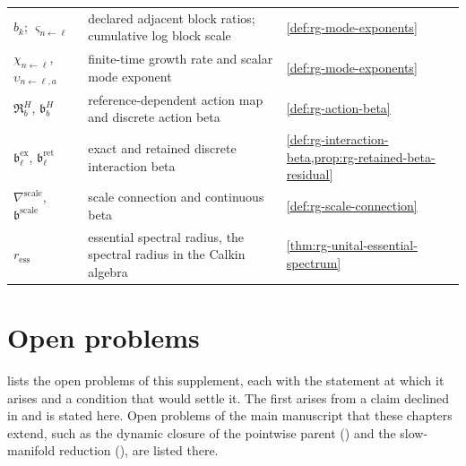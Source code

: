 {\begin{longtable}{@{}>{\raggedright\arraybackslash}p{}
>{\raggedright\arraybackslash}p{}
>{\raggedright\arraybackslash}p{}@{}}
$b_k$; $\varsigma_{n\leftarrow\ell}$ & declared adjacent block ratios; cumulative log block scale & \cref{def:rg-mode-exponents} \\
$\chi_{n\leftarrow\ell}$, $\upsilon_{n\leftarrow\ell,a}$ & finite-time growth rate and scalar mode exponent & \cref{def:rg-mode-exponents} \\
$\mathfrak R^H_b$, $\mathfrak b^H_b$ & reference-dependent action map and discrete action beta & \cref{def:rg-action-beta} \\
$\mathfrak b^{\mathrm{ex}}_\ell$, $\mathfrak b^{\mathrm{ret}}_\ell$ & exact and retained discrete interaction beta & \cref{def:rg-interaction-beta,prop:rg-retained-beta-residual} \\
$\nabla^{\mathrm{scale}}$, $\mathfrak b^{\mathrm{scale}}$ & scale connection and continuous beta & \cref{def:rg-scale-connection} \\
$r_{\mathrm{ess}}$ & essential spectral radius, the spectral radius in the Calkin algebra & \cref{thm:rg-unital-essential-spectrum} \\
\end{longtable}
}

\section{Open problems}

 lists the open problems of this supplement, each with the statement at which it
arises and a condition that would settle it. The first arises from a claim declined in
 and is stated here. Open problems of the main manuscript that these
chapters extend, such as the dynamic closure of the pointwise parent
() and the slow-manifold reduction
(), are listed there.

